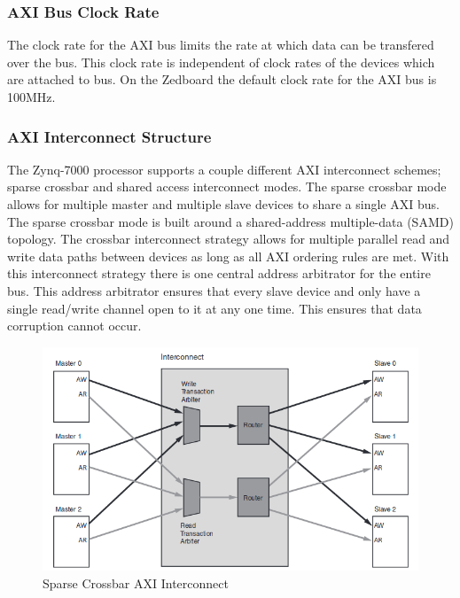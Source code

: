\documentclass[journal]{IEEEtran}
\begin{document}
\subsubsection{AXI Bus Clock Rate}
The clock rate for the AXI bus limits the rate at which data can be transfered over the bus. This clock rate is independent of clock rates of the devices which are attached to bus. On the Zedboard the default clock rate for the AXI bus is 100MHz. \\


\subsubsection{AXI Interconnect Structure}
The Zynq-7000 processor supports a couple different AXI interconnect schemes; sparse crossbar and shared access interconnect modes. The sparse crossbar mode allows for multiple master and multiple slave devices to share a single AXI bus. The sparse crossbar mode is built around a shared-address multiple-data (SAMD) topology. The crossbar interconnect strategy allows for multiple parallel read and write data paths between devices as long as all AXI ordering rules are met. With this interconnect strategy there is one central address arbitrator for the entire bus. This address arbitrator ensures that every slave device and only have a single read/write channel open to it at any one time. This ensures that data corruption cannot occur. \\


\begin{figure}[!th]
\centering
\includegraphics[scale=.3]{Images/Crossbar_Interconnect.png}
\caption{Sparse Crossbar AXI Interconnect \cite{AXI_Reference_Guide}}
\label{fig:Crossbar_Interconnect}
\end{figure} 
\end{document}
